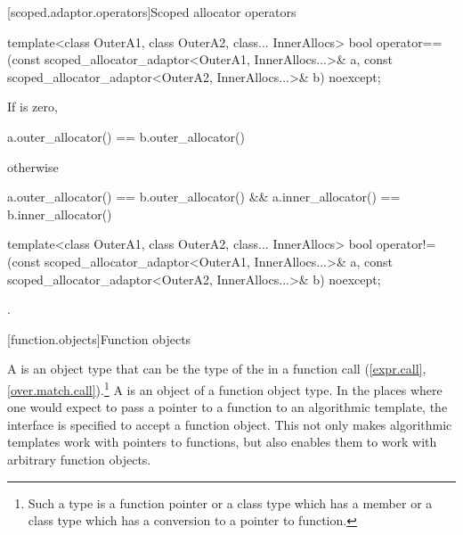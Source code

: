 [scoped.adaptor.operators]{Scoped allocator operators}

%
\begin{itemdecl}
template<class OuterA1, class OuterA2, class... InnerAllocs>
  bool operator==(const scoped_allocator_adaptor<OuterA1, InnerAllocs...>& a,
                  const scoped_allocator_adaptor<OuterA2, InnerAllocs...>& b) noexcept;
\end{itemdecl}

\begin{itemdescr}
\pnum
\returns If  is zero,
\begin{codeblock}
a.outer_allocator() == b.outer_allocator()
\end{codeblock}
otherwise
\begin{codeblock}
a.outer_allocator() == b.outer_allocator() && a.inner_allocator() == b.inner_allocator()
\end{codeblock}
\end{itemdescr}

%
\begin{itemdecl}
template<class OuterA1, class OuterA2, class... InnerAllocs>
  bool operator!=(const scoped_allocator_adaptor<OuterA1, InnerAllocs...>& a,
                  const scoped_allocator_adaptor<OuterA2, InnerAllocs...>& b) noexcept;
\end{itemdecl}

\begin{itemdescr}
\pnum
\returns {}.
\end{itemdescr}

[function.objects]{Function objects}

\pnum
A  is an object
type that can be the type of the
 in a function call
(\ref{expr.call}, \ref{over.match.call}).\footnote{Such a type is a function
pointer or a class type which has a member  or a class type
which has a conversion to a pointer to function.} A  is an
object of a function object type. In the places where one would expect to pass a
pointer to a function to an algorithmic template, the
interface is specified to accept a function object. This not only makes
algorithmic templates work with pointers to functions, but also enables them to
work with arbitrary function objects.

